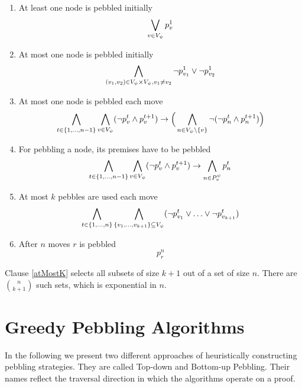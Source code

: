 \documentclass{llncs}
\begin{document}
\begin{enumerate}
	\item At least one node is pebbled initially\\
				$$\bigvee_{v \in V_{\psi}} p_{v}^{1}$$
				
	\item At most one node is pebbled initially\\
				$$\bigwedge_{(v_1, v_2) \in V_{\psi} \times V_{\psi}, v_1 \neq v_2} \neg p_{v_1}^{1} \vee \neg p_{v_2}^{1}$$
				
	\item At most one node is pebbled each move\\
				$$\bigwedge_{t \in \{1,\ldots,n-1\}} \bigwedge_{v \in V_{\psi}} (\neg p_{v}^t \wedge p_{v}^{t+1}) \rightarrow 
				\Big(\bigwedge_{n \in V_{\psi} \setminus \{v\}} \neg (\neg p_{n}^t \wedge p_{n}^{t+1})\Big)$$
				
	\item For pebbling a node, its premises have to be pebbled\\
				$$\bigwedge_{t \in \{1,\ldots,n-1\}} \bigwedge_{v \in V_{\psi}} (\neg p_{v}^t \wedge p_{v}^{t+1}) \rightarrow
				\bigwedge_{n \in P_{v}^{\psi}} p_{n}^t$$
				
	\item \label{atMostK} At most $k$ pebbles are used each move\\
				$$\bigwedge_{t \in \{1,\ldots,n\}} \bigwedge_{\{v_1,\ldots,v_{k+1}\} \subseteq V_{\psi}} (\neg p_{v_1}^t \vee \ldots \vee \neg p_{v_{k+1}}^t)$$
				
	\item After $n$ moves $r$ is pebbled \\
				$$p_{r}^{n}$$
\end{enumerate}

Clause \ref{atMostK} selects all subsets of size $k+1$ out of a set of size $n$. There are $n \choose k+1$ such sets, which is exponential in $n$.

\section{Greedy Pebbling Algorithms}

In the following we present two different approaches of heuristically constructing pebbling strategies.
They are called Top-down and Bottom-up Pebbling. Their names reflect the traversal direction in which the algorithms operate on a proof.
\end{document}
